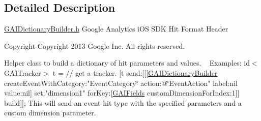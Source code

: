\subsection{Detailed Description}
\hyperlink{_g_a_i_dictionary_builder_8h}{G\+A\+I\+Dictionary\+Builder.\+h}  Google Analytics i\+OS S\+DK Hit Format Header \begin{DoxyCopyright}{Copyright}
Copyright 2013 Google Inc. All rights reserved.
\end{DoxyCopyright}
Helper class to build a dictionary of hit parameters and values. ~\newline
 Examples\+: {\ttfamily  id$<$\+G\+A\+I\+Tracker$>$ t = // get a tracker. \mbox{[}t send\+:\mbox{[}\mbox{[}\mbox{[}\hyperlink{interface_g_a_i_dictionary_builder}{G\+A\+I\+Dictionary\+Builder} create\+Event\+With\+Category\+:"Event\+Category\char`\"{}
                                                 action\+:@\char`\"{}Event\+Action" label\+:nil value\+:nil\mbox{]} set\+:"dimension1" for\+Key\+:\mbox{[}\hyperlink{interface_g_a_i_fields}{G\+A\+I\+Fields} custom\+Dimension\+For\+Index\+:1\mbox{]}\mbox{]} build\mbox{]}\mbox{]}; } This will send an event hit type with the specified parameters and a custom dimension parameter. ~\newline
